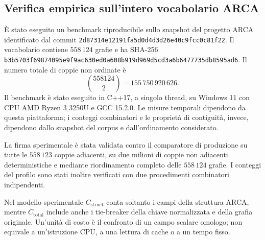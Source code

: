 \documentclass[11pt,a4paper]{article}
\theoremstyle{definition}
\theoremstyle{remark}
\begin{document}
\subsection{Verifica empirica sull'intero vocabolario ARCA}

È stato eseguito un benchmark riproducibile sullo snapshot del progetto ARCA identificato dal commit
\texttt{2d87314e12191fa5d0d4d3d26e40c9fcc0c81f22}. Il vocabolario contiene $558\,124$ grafie e ha SHA-256
\texttt{b3b5703f69874095e9f9ac630ed0a608b919d969d5cd3a6b6477735db8595ad6}. Il numero totale di coppie non ordinate è
\[
  \binom{558124}{2}=155\,750\,920\,626.
\]
Il benchmark è stato eseguito in C++17, a singolo thread, su Windows 11 con CPU AMD Ryzen 3 3250U e GCC 15.2.0. Le misure temporali dipendono da questa piattaforma; i conteggi combinatori e le proprietà di contiguità, invece, dipendono dallo snapshot del corpus e dall'ordinamento considerato.

La firma sperimentale è stata validata contro il comparatore di produzione su tutte le $558\,123$ coppie adiacenti, su due milioni di coppie non adiacenti deterministiche e mediante riordinamento completo delle $558\,124$ grafie. I conteggi del profilo sono stati inoltre verificati con due procedimenti combinatori indipendenti.

Nel modello sperimentale $C_{\mathrm{struct}}$ conta soltanto i campi della struttura ARCA, mentre $C_{\mathrm{total}}$ include anche i tie-breaker della chiave normalizzata e della grafia originale. Un'unità di costo è il confronto di un campo scalare omologo; non equivale a un'istruzione CPU, a una lettura di cache o a un tempo fisso.

\begin{table}[htbp]
\centering
\caption{Distribuzione empirica di $C_{\mathrm{total}}$ per differenti popolazioni di coppie.}
\label{tab:costo-empirico}
\end{table}
\end{document}
